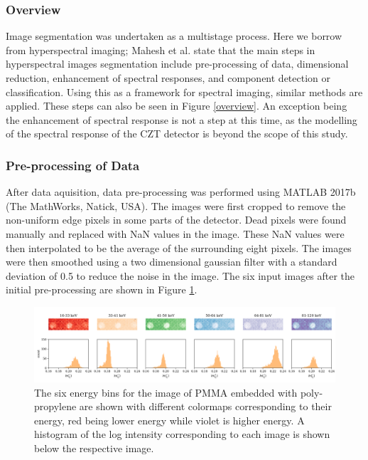 \documentclass[a4paper,11pt]{article}
\begin{document}
\subsubsection{Overview}

Image segmentation was undertaken as a multistage process. Here we borrow from hyperspectral imaging; Mahesh et al. \cite{Mahesh2015HyperspectralMaterials} state that the main steps in hyperspectral images segmentation include pre-processing of data, dimensional reduction, enhancement of spectral responses, and component detection or classification. Using this as a framework for spectral imaging, similar methods are applied. These steps can also be seen in Figure \ref{overview}. An exception being the enhancement of spectral response is not a step at this time, as the modelling of the spectral response of the CZT detector is beyond the scope of this study.

\subsubsection{Pre-processing of Data}

After data aquisition, data pre-processing was performed using MATLAB 2017b (The MathWorks, Natick, USA). The images were first cropped to remove the non-uniform edge pixels in some parts of the detector. Dead pixels were found manually and replaced with NaN values in the image. These NaN values were then interpolated to be the average of the surrounding eight pixels. The images were then smoothed using a two dimensional gaussian filter with a standard deviation of 0.5 to reduce the noise in the image. The six input images after the initial pre-processing are shown in Figure \ref{demonstrating_bins}.

\begin{figure}[htbp]

\includegraphics[width=\textwidth]{figures/poly_figure2.png}

\caption{The six energy bins for the image of PMMA embedded with poly-propylene are shown with different colormaps corresponding to their energy, red being lower energy while violet is higher energy. A histogram of the log intensity corresponding to each image is shown below the respective image.}
\label{demonstrating_bins}
\end{figure}
\end{document}
